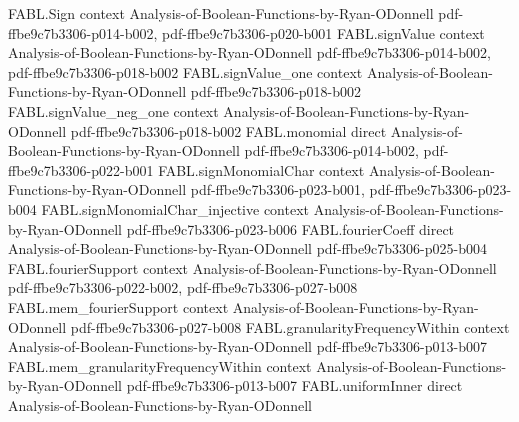 \begin{theorem}
\label{FABL.productInfluence_biased_eq_sigma_mul_singletonCoeff_of_monotone}
\leanok
{}
\proofstep
  {FABL.Sign}
  {context}
  {Analysis-of-Boolean-Functions-by-Ryan-ODonnell}
  {pdf-ffbe9c7b3306-p014-b002,
    pdf-ffbe9c7b3306-p020-b001}
\proofstep
  {FABL.signValue}
  {context}
  {Analysis-of-Boolean-Functions-by-Ryan-ODonnell}
  {pdf-ffbe9c7b3306-p014-b002,
    pdf-ffbe9c7b3306-p018-b002}
\proofstep
  {FABL.signValue_one}
  {context}
  {Analysis-of-Boolean-Functions-by-Ryan-ODonnell}
  {pdf-ffbe9c7b3306-p018-b002}
\proofstep
  {FABL.signValue_neg_one}
  {context}
  {Analysis-of-Boolean-Functions-by-Ryan-ODonnell}
  {pdf-ffbe9c7b3306-p018-b002}
\proofstep
  {FABL.monomial}
  {direct}
  {Analysis-of-Boolean-Functions-by-Ryan-ODonnell}
  {pdf-ffbe9c7b3306-p014-b002,
    pdf-ffbe9c7b3306-p022-b001}
\proofstep
  {FABL.signMonomialChar}
  {context}
  {Analysis-of-Boolean-Functions-by-Ryan-ODonnell}
  {pdf-ffbe9c7b3306-p023-b001,
    pdf-ffbe9c7b3306-p023-b004}
\proofstep
  {FABL.signMonomialChar_injective}
  {context}
  {Analysis-of-Boolean-Functions-by-Ryan-ODonnell}
  {pdf-ffbe9c7b3306-p023-b006}
\proofstep
  {FABL.fourierCoeff}
  {direct}
  {Analysis-of-Boolean-Functions-by-Ryan-ODonnell}
  {pdf-ffbe9c7b3306-p025-b004}
\proofstep
  {FABL.fourierSupport}
  {context}
  {Analysis-of-Boolean-Functions-by-Ryan-ODonnell}
  {pdf-ffbe9c7b3306-p022-b002,
    pdf-ffbe9c7b3306-p027-b008}
\proofstep
  {FABL.mem_fourierSupport}
  {context}
  {Analysis-of-Boolean-Functions-by-Ryan-ODonnell}
  {pdf-ffbe9c7b3306-p027-b008}
\proofstep
  {FABL.granularityFrequencyWithin}
  {context}
  {Analysis-of-Boolean-Functions-by-Ryan-ODonnell}
  {pdf-ffbe9c7b3306-p013-b007}
\proofstep
  {FABL.mem_granularityFrequencyWithin}
  {context}
  {Analysis-of-Boolean-Functions-by-Ryan-ODonnell}
  {pdf-ffbe9c7b3306-p013-b007}
\proofstep
  {FABL.uniformInner}
  {direct}
  {Analysis-of-Boolean-Functions-by-Ryan-ODonnell}

\end{theorem}
